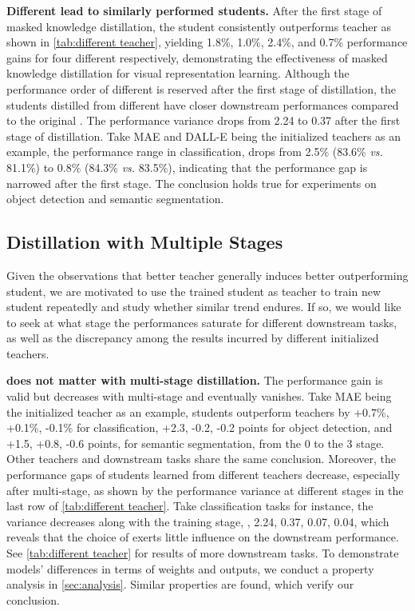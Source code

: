 \documentclass[10pt,twocolumn,letterpaper]{article}
\renewcommand{\paragraph}[1]{\vspace{1.25mm}\noindent\textbf{#1}}
\begin{document}
\paragraph{Different  lead to similarly performed students.}
After the first stage of masked knowledge distillation, the student consistently outperforms teacher as shown in \cref{tab:different teacher}, yielding 1.8\%, 1.0\%, 2.4\%, and 0.7\% performance gains for four different  respectively, demonstrating the effectiveness of masked knowledge distillation for visual representation learning. 
Although the performance order of different  is reserved after the first stage of distillation, the students distilled from different  have closer downstream performances compared to the original . 
The performance variance drops from 2.24 to 0.37 after the first stage of distillation.
Take MAE and DALL-E being the initialized teachers as an example, the performance range in classification, drops from 2.5\% (83.6\% \textit{vs.} 81.1\%) to 0.8\% (84.3\% \textit{vs.} 83.5\%), indicating that the performance gap is narrowed after the first stage.
The conclusion holds true for experiments on object detection and semantic segmentation.

\subsection{Distillation with Multiple Stages}
Given the observations that better teacher generally induces better outperforming student, we are motivated to use the trained student as teacher to train new student repeatedly and study whether similar trend endures. If so, we would like to seek at what stage the performances saturate for different downstream tasks, as well as the discrepancy among the results incurred by different initialized teachers.

\paragraph{ does not matter with multi-stage distillation.}
The performance gain is valid but decreases with multi-stage and eventually vanishes. Take MAE being the initialized teacher as an example, students outperform teachers by +0.7\%, +0.1\%, -0.1\% for classification, +2.3, -0.2, -0.2 points for object detection, and +1.5, +0.8, -0.6 points, for semantic segmentation, from the 0 to the 3 stage. Other teachers and downstream tasks share the same conclusion.
Moreover, the performance gaps of students learned from different teachers decrease, especially after multi-stage, as shown by the performance variance at different stages in the last row of \cref{tab:different teacher}. Take classification tasks for instance, the variance decreases along with the training stage, \ie, 2.24, 0.37, 0.07, 0.04, which reveals that the choice of  exerts little influence on the downstream performance. See \cref{tab:different teacher} for results of more downstream tasks.
To demonstrate models' differences in terms of weights and outputs, we conduct a property analysis in \cref{sec:analysis}.
Similar properties are found, which verify our conclusion.
\end{document}
